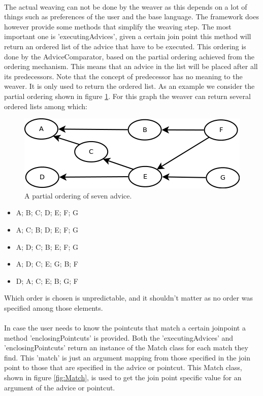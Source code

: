 \documentclass[a4paper]{report}
\begin{document}
\\
The actual weaving can not be done by the weaver as this depends on a lot of things such as preferences of the user and the base language. The framework does however provide some methods that simplify the weaving step. The most important one is 'executingAdvices', given a certain join point this method will return an ordered list of the advice that have to be executed. This ordering is done by the AdviceComparator, based on the partial ordering achieved from the ordering mechanism. This means that an advice in the list will be placed after all its predecessors. Note that the concept of predecessor has no meaning to the weaver. It is only used to return the ordered list. As an example we consider the partial ordering shown in figure \ref{fig:Order}. For this graph the weaver can return several ordered lists among which:
\begin{figure}
\centering
\includegraphics[scale=0.5]{images/AOF/Order.png}
\caption{A partial ordering of seven advice.}
\label{fig:Order}
\vspace{-80pt}
\end{figure}
\begin{itemize}
\item A; B; C; D; E; F; G
\item A; C; B; D; E; F; G
\item A; D; C; B; E; F; G
\item A; D; C; E; G; B; F
\item D; A; C; E; B; G; F
\end{itemize}
Which order is chosen is unpredictable, and it shouldn't matter as no order was specified among those elements.\\
\\
In case the user needs to know the pointcuts that match a certain joinpoint a method 'enclosingPointcuts' is provided. Both the 'executingAdvices' and 'enclosingPointcuts' return an instance of the Match class for each match they find. This 'match' is just an argument mapping from those specified in the join point to those that are specified in the advice or pointcut. This Match class, shown in figure \ref{fig:Match}, is used to get the join point specific value for an argument of the advice or pointcut.\\
\end{document}
